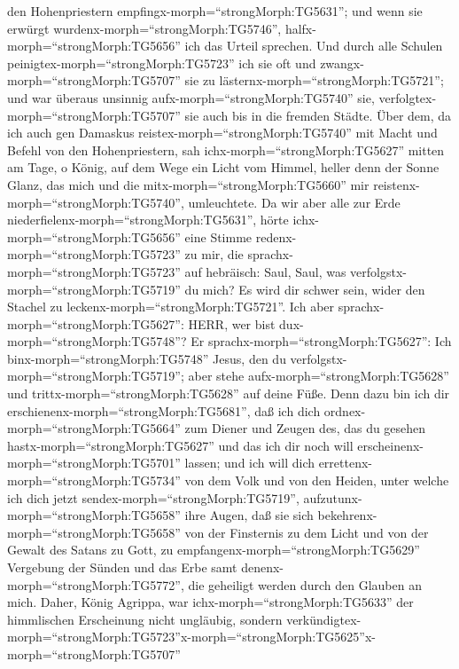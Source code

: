 den Hohenpriestern empfingx-morph=``strongMorph:TG5631''; und wenn sie
erwürgt wurdenx-morph=``strongMorph:TG5746'',
halfx-morph=``strongMorph:TG5656'' ich das Urteil sprechen.
 Und durch alle Schulen
peinigtex-morph=``strongMorph:TG5723'' ich sie oft und
zwangx-morph=``strongMorph:TG5707'' sie zu
lästernx-morph=``strongMorph:TG5721''; und war überaus unsinnig
aufx-morph=``strongMorph:TG5740'' sie,
verfolgtex-morph=``strongMorph:TG5707'' sie auch bis in die fremden
Städte.  Über dem, da ich auch gen Damaskus
reistex-morph=``strongMorph:TG5740'' mit Macht und Befehl von den
Hohenpriestern,  sah ichx-morph=``strongMorph:TG5627''
mitten am Tage, o König, auf dem Wege ein Licht vom Himmel, heller denn
der Sonne Glanz, das mich und die mitx-morph=``strongMorph:TG5660'' mir
reistenx-morph=``strongMorph:TG5740'', umleuchtete.  Da wir
aber alle zur Erde niederfielenx-morph=``strongMorph:TG5631'', hörte
ichx-morph=``strongMorph:TG5656'' eine Stimme
redenx-morph=``strongMorph:TG5723'' zu mir, die
sprachx-morph=``strongMorph:TG5723'' auf hebräisch: Saul, Saul, was
verfolgstx-morph=``strongMorph:TG5719'' du mich? Es wird dir schwer
sein, wider den Stachel zu leckenx-morph=``strongMorph:TG5721''.
 Ich aber sprachx-morph=``strongMorph:TG5627'': HERR, wer
bist dux-morph=``strongMorph:TG5748''? Er
sprachx-morph=``strongMorph:TG5627'': Ich
binx-morph=``strongMorph:TG5748'' Jesus, den du
verfolgstx-morph=``strongMorph:TG5719''; aber stehe
aufx-morph=``strongMorph:TG5628'' und
trittx-morph=``strongMorph:TG5628'' auf deine Füße.  Denn
dazu bin ich dir erschienenx-morph=``strongMorph:TG5681'', daß ich dich
ordnex-morph=``strongMorph:TG5664'' zum Diener und Zeugen des, das du
gesehen hastx-morph=``strongMorph:TG5627'' und das ich dir noch will
erscheinenx-morph=``strongMorph:TG5701'' lassen;  und ich
will dich errettenx-morph=``strongMorph:TG5734'' von dem Volk und von
den Heiden, unter welche ich dich jetzt
sendex-morph=``strongMorph:TG5719'', 
aufzutunx-morph=``strongMorph:TG5658'' ihre Augen, daß sie sich
bekehrenx-morph=``strongMorph:TG5658'' von der Finsternis zu dem Licht
und von der Gewalt des Satans zu Gott, zu
empfangenx-morph=``strongMorph:TG5629'' Vergebung der Sünden und das
Erbe samt denenx-morph=``strongMorph:TG5772'', die geheiligt werden
durch den Glauben an mich.  Daher, König Agrippa, war
ichx-morph=``strongMorph:TG5633'' der himmlischen Erscheinung nicht
ungläubig,  sondern
verkündigtex-morph=``strongMorph:TG5723''\textbar x-morph=``strongMorph:TG5625''x-morph=``strongMorph:TG5707''
